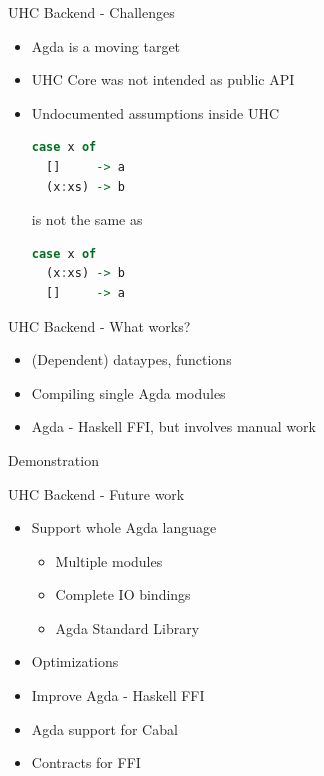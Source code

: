 \begin{frame}[fragile]{UHC Backend - Challenges}
\begin{itemize}
\item Agda is a moving target
\item UHC Core was not intended as public API
\item Undocumented assumptions inside UHC
\pause
\begin{lstlisting}[language=Haskell]
case x of
  []     -> a
  (x:xs) -> b
\end{lstlisting}
is not the same as
\begin{lstlisting}[language=Haskell]
case x of
  (x:xs) -> b
  []     -> a
\end{lstlisting}
\end{itemize}
\end{frame}

\begin{frame}{UHC Backend - What works?}
\begin{itemize}
\item (Dependent) dataypes, functions
\item Compiling single Agda modules
\item Agda - Haskell FFI, but involves manual work
\end{itemize}
\end{frame}

\begin{frame}
Demonstration
\end{frame}

\begin{frame}{UHC Backend - Future work}
\begin{itemize}
\item Support whole Agda language
  \begin{itemize}
  \item Multiple modules
  \item Complete IO bindings
  \item Agda Standard Library
  \end{itemize}
\item Optimizations
\item Improve Agda - Haskell FFI
\item Agda support for Cabal
\item Contracts for FFI
\end{itemize}
\end{frame}
